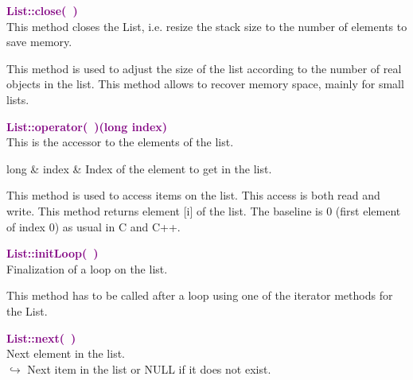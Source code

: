 \textcolor{purple}{\textbf{List::close(~)}}\label{List::close()}\\
This method closes the List, i.e. resize the stack size to the number of elements to save memory.

This method is used to adjust the size of the list according to the number of real objects in the list.
This method allows to recover memory space, mainly for small lists.

\textcolor{purple}{\textbf{List::operator(~)(long index)}}\label{List::operator()(long index)}\\
This is the accessor to the elements of the list.

\begin{tcolorbox}[width=\textwidth,myArgs,tabularx={ll|R}]
long & index & Index of the element to get in the list.
\end{tcolorbox}

This method is used to access items on the list.
This access is both read and write.
This method returns element [i] of the list.
The baseline is 0 (first element of index 0) as usual in C and C++.

\textcolor{purple}{\textbf{List::initLoop(~)}}\label{List::initLoop()}\\
Finalization of a loop on the list.

This method has to be called after a loop using one of the iterator methods for the List.

\textcolor{purple}{\textbf{List::next(~)}}\label{List::next()}\\
Next element in the list.\\ \hspace*{10mm}$\hookrightarrow$ Next item in the list or NULL if it does not exist.

